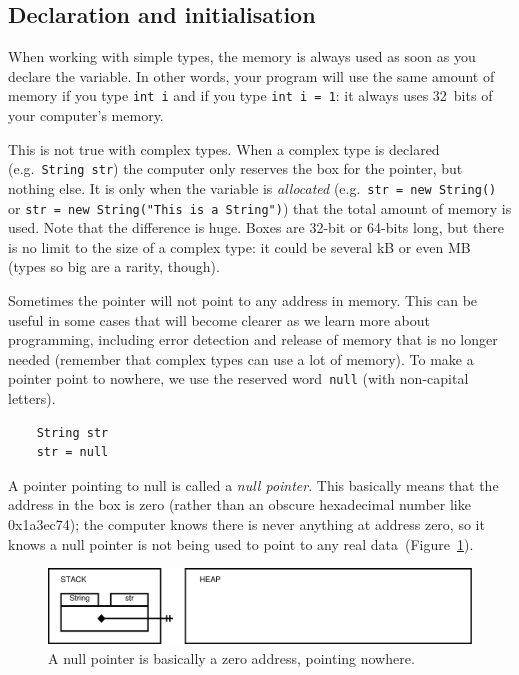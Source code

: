 \subsection{Declaration and initialisation}
\label{sec:decl-init}

When working with simple types, the memory is always used as soon as
you declare the variable. In other words, your program will use the
same amount of memory if you type \verb+int i+ and if you type
\verb+int i = 1+: it always uses 32~bits of your computer's memory. 

This is not true with complex types. When a complex type is declared
(e.g.~\verb+String str+) the computer only reserves the box for the pointer,
but nothing else. It is only when the variable is \emph{allocated}
(e.g.~\verb+str = new String()+ 
or \verb+str = new String("This is a String")+) that the total amount
of memory is used. Note that the difference is huge. Boxes are 32-bit
or 64-bits long, but there is no limit to the size of a complex type:
it could be several kB or even MB (types so big are a rarity,
though). 

Sometimes the pointer will 
not point to any address in memory. This can be useful in
some cases that will become clearer as we learn more about
programming, including error detection and release of memory that is
no longer needed (remember that complex types can use a lot of
memory). To make a pointer point to nowhere, we use the
reserved word~\verb+null+ (with non-capital letters).

\begin{verbatim}
    String str
    str = null
\end{verbatim}

A pointer pointing to null is called a \emph{null pointer}. This
basically means that the address in the box is zero (rather than an
obscure hexadecimal number like 0x1a3ec74); the computer
knows there is never anything at address zero, so it knows a null
pointer is not being used to point to any real
data~(Figure~\ref{fig:nullpiounter}).

\begin{figure}[htbp]
  \centering
  \includegraphics[width=\textwidth]{gfx/variables-string-null}
  \caption{A null pointer is basically a zero address, pointing nowhere.}
  \label{fig:nullpiounter}
\end{figure}

